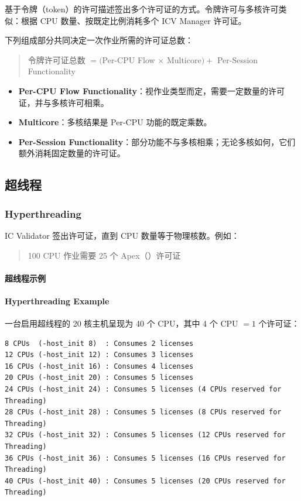 基于令牌（token）的许可描述签出多个许可证的方式。令牌许可与多核许可类似：根据 CPU 数量、按既定比例消耗多个 ICV Manager 许可证。

下列组成部分共同决定一次作业所需的许可证总数：
\begin{quote}
令牌许可证总数 $= ($Per-CPU Flow $\times$ Multicore$) +$ Per-Session Functionality
\end{quote}
\begin{itemize}
  \item \textbf{Per-CPU Flow Functionality}：视作业类型而定，需要一定数量的许可证，并与多核许可相乘。
  \item \textbf{Multicore}：多核结果是 Per-CPU 功能的既定乘数。
  \item \textbf{Per-Session Functionality}：部分功能不与多核相乘；无论多核如何，它们额外消耗固定数量的许可证。
\end{itemize}

\subsection{超线程}
\subsubsection*{Hyperthreading}

IC Validator 签出许可证，直到 CPU 数量等于物理核数。例如：
\begin{quote}
100 CPU 作业需要 25 个 Apex（）许可证
\end{quote}

\paragraph{超线程示例}
\paragraph*{Hyperthreading Example}

一台启用超线程的 20 核主机呈现为 40 个 CPU，其中 4 个 CPU $= 1$ 个许可证：
\begin{lstlisting}
8 CPUs  (-host_init 8)  : Consumes 2 licenses
12 CPUs (-host_init 12) : Consumes 3 licenses
16 CPUs (-host_init 16) : Consumes 4 licenses
20 CPUs (-host_init 20) : Consumes 5 licenses
24 CPUs (-host_init 24) : Consumes 5 licenses (4 CPUs reserved for Threading)
28 CPUs (-host_init 28) : Consumes 5 licenses (8 CPUs reserved for Threading)
32 CPUs (-host_init 32) : Consumes 5 licenses (12 CPUs reserved for Threading)
36 CPUs (-host_init 36) : Consumes 5 licenses (16 CPUs reserved for Threading)
40 CPUs (-host_init 40) : Consumes 5 licenses (20 CPUs reserved for Threading)
\end{lstlisting}

